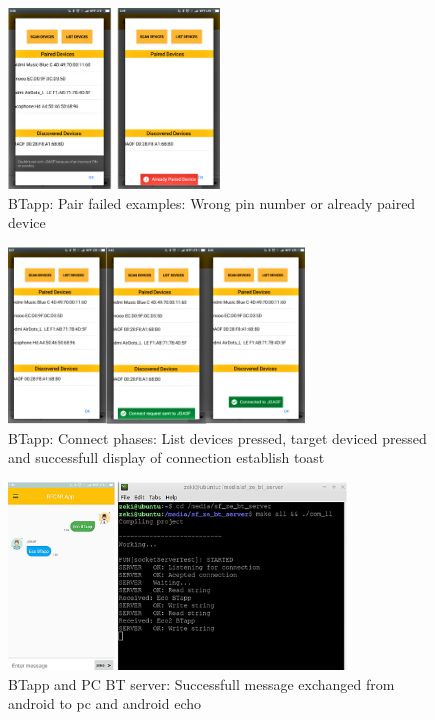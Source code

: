 %
\begin{figure}[!hbt]
\centering
\includegraphics[width=0.5\textwidth]{img/bt_failed_pair.png}
\caption{\label{fig:bt_failed_pair}BTapp: Pair failed examples: Wrong pin number or already paired device}
\end{figure}
%
\begin{figure}[!hbt]
\centering
\includegraphics[width=0.7\textwidth]{img/bt_sequence_connect.png}
\caption{\label{fig:bt_sequence_connect}BTapp: Connect phases: List devices pressed, target deviced pressed and successfull display of connection establish toast}
\end{figure}
%
\begin{figure}[!hbt]
\centering
\includegraphics[width=0.8\textwidth]{img/bt_sendapp_recpc.png}
\caption{\label{fig:bt_sendapp_recpc}BTapp and PC BT server: Successfull message exchanged from android to pc and android echo}
\end{figure}
